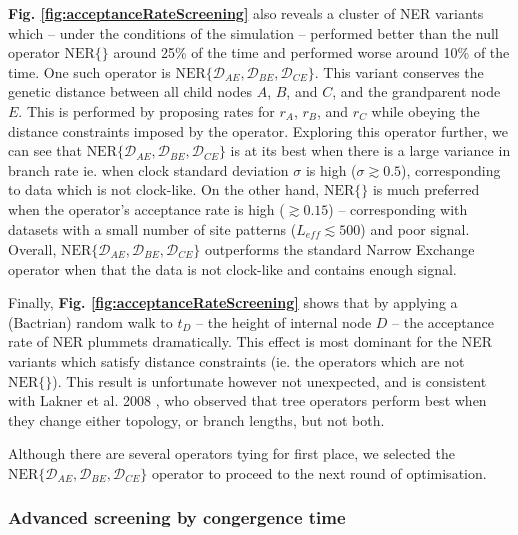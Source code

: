 \documentclass[10pt,letterpaper]{article}
\begin{document}
\textbf{Fig. \ref{fig:acceptanceRateScreening}} also reveals a cluster of NER variants which -- under the conditions of the simulation --  performed better than the null operator $\text{NER}\{\}$ around 25\% of the time and performed worse around 10\% of the time. One such operator is  $\text{NER}\{\mathcal{D}_{AE}, \mathcal{D}_{BE}, \mathcal{D}_{CE}\}$. This variant conserves the genetic distance between all child nodes $A$, $B$, and $C$, and the grandparent node $E$. This is performed by proposing rates for $r_A$, $r_B$, and $r_C$ while obeying the distance constraints imposed by the operator. Exploring this operator further, we can see that $\text{NER}\{\mathcal{D}_{AE}, \mathcal{D}_{BE}, \mathcal{D}_{CE}\}$ is at its best when there is a large variance in branch rate ie. when clock standard deviation $\sigma$ is high ($\sigma \gtrsim 0.5$), corresponding to data which is not clock-like. On the other hand, $\text{NER}\{\}$ is much preferred when the operator's acceptance rate is high ($\gtrsim 0.15$) -- corresponding with datasets with a small number of site patterns ($L_\textit{eff} \lesssim 500$) and poor signal.  Overall, $\text{NER}\{\mathcal{D}_{AE}, \mathcal{D}_{BE}, \mathcal{D}_{CE}\}$ outperforms the standard Narrow Exchange operator when that the data is not clock-like and contains enough signal. 




Finally, \textbf{Fig. \ref{fig:acceptanceRateScreening}} shows that by applying a (Bactrian) random walk to $t_D$ -- the height of internal node $D$ -- the acceptance rate of NER plummets dramatically. This effect is most dominant for the NER variants which satisfy distance constraints (ie. the operators which are not $\text{NER}\{\}$). This result is unfortunate however not unexpected, and is consistent with Lakner et al. 2008 \cite{lakner2008efficiency}, who observed that tree operators perform best when they change either topology, or branch lengths, but not both.



Although there are several operators tying for first place, we selected the $\text{NER}\{\mathcal{D}_{AE}, \mathcal{D}_{BE}, \mathcal{D}_{CE}\}$ operator to proceed to the next round of optimisation.





\subsubsection*{Advanced screening by congergence time}
\end{document}
